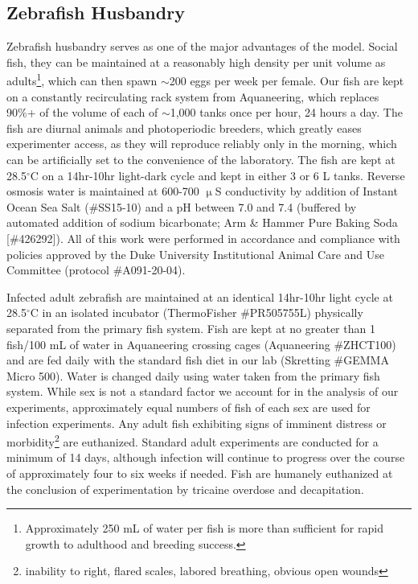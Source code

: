 \subsection{Zebrafish Husbandry}\label{husbandry}

Zebrafish husbandry serves as one of the major advantages of the model. Social fish, they can be maintained at a reasonably high density per unit volume as adults\footnote{Approximately 250 mL of water per fish is more than sufficient for rapid growth to adulthood and breeding success.}, which can then spawn ${\sim}$200 eggs per week per female. Our fish are kept on a constantly recirculating rack system from Aquaneering, which replaces 90\%+ of the volume of each of ${\sim}$1,000 tanks once per hour, 24 hours a day. The fish are diurnal animals and photoperiodic breeders, which greatly eases experimenter access, as they will reproduce reliably only in the morning, which can be artificially set to the convenience of the laboratory. The fish are kept at 28.5$^{\circ}$C on a 14hr-10hr light-dark cycle and kept in either 3 or 6 L tanks. Reverse osmosis water is maintained at 600-700 $\upmu$S conductivity by addition of Instant Ocean Sea Salt (\#SS15-10) and a pH between 7.0 and 7.4 (buffered by automated addition of sodium bicarbonate; Arm \& Hammer Pure Baking Soda [\#426292]). All of this work were performed in accordance and compliance with policies approved by the Duke University Institutional Animal Care and Use Committee (protocol \#A091-20-04).

Infected adult zebrafish are maintained at an identical 14hr-10hr light cycle at 28.5$^{\circ}$C in an isolated incubator (ThermoFisher \#PR505755L) physically separated from the primary fish system. Fish are kept at no greater than 1 fish/100 mL of water in Aquaneering crossing cages (Aquaneering \#ZHCT100) and are fed daily with the standard fish diet in our lab (Skretting \#GEMMA Micro 500). Water is changed daily using water taken from the primary fish system. While sex is not a standard factor we account for in the analysis of our experiments, approximately equal numbers of fish of each sex are used for infection experiments. Any adult fish exhibiting signs of imminent distress or morbidity\footnote{inability to right, flared scales, labored breathing, obvious open wounds} are euthanized. Standard adult experiments are conducted for a minimum of 14 days, although infection will continue to progress over the course of approximately four to six weeks if needed. Fish are humanely euthanized at the conclusion of experimentation by tricaine overdose and decapitation.


